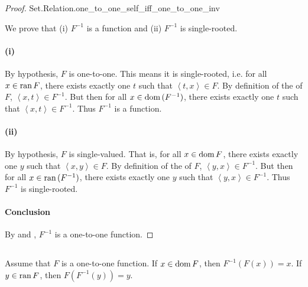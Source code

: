\documentclass{report}
\begin{document}
\begin{proof}

    {Set.Relation.one\_to\_one\_self\_iff\_one\_to\_one\_inv}

  We prove that (i) $F^{-1}$ is a function and (ii) $F^{-1}$ is single-rooted.

  \paragraph{(i)}%
  \label{par:lemma-1-i}

    By hypothesis, $F$ is one-to-one.
    This means it is single-rooted, i.e. for all $x \in \mathop{\text{ran}}{F}$, there exists
      exactly one $t$ such that $\left< t, x \right> \in F$.
    By definition of the  of $F$,
      $\left< x, t \right> \in F^{-1}$.
    But then for all $x \in \mathop{\text{dom}}{(F^{-1})}$, there exists exactly one $t$ such
      that $\left< x, t \right> \in F^{-1}$.
    Thus $F^{-1}$ is a function.

  \paragraph{(ii)}%
  \label{par:lemma-1-ii}

    By hypothesis, $F$ is single-valued.
    That is, for all $x \in \mathop{\text{dom}}{F}$, there exists exactly one $y$ such that
      $\left< x, y \right> \in F$.
    By definition of the  of $F$,
      $\left< y, x \right> \in F^{-1}$.
    But then for all $x \in \mathop{\text{ran}}{(F^{-1})}$, there exists exactly one $y$ such
      that $\left< y, x \right> \in F^{-1}$.
    Thus $F^{-1}$ is single-rooted.

  \paragraph{Conclusion}%

    By  and , $F^{-1}$ is
      a one-to-one function.

\end{proof}

\subsection{}%
\label{sub:theorem-3g}

\begin{theorem}[3G]

  Assume that $F$ is a one-to-one function.
  If $x \in \mathop{\text{dom}}{F}$, then $F^{-1}(F(x)) = x$.
  If $y \in \mathop{\text{ran}}{F}$, then $F(F^{-1}(y)) = y$.

\end{theorem}
\end{document}
